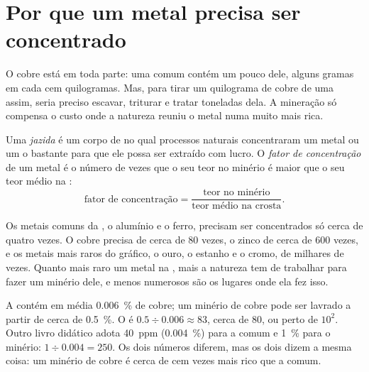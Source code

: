 \section{Por que um metal precisa ser concentrado}

O cobre está em toda parte: uma  comum contém um pouco dele, alguns
gramas em cada cem quilogramas. Mas, para tirar um quilograma de cobre de
uma  assim, seria preciso escavar, triturar e tratar toneladas dela.
A mineração só compensa o custo onde a natureza reuniu o metal numa 
muito mais rica.

\begin{definition}\label{def:g9:earth-resources:ore-deposit}
Uma \emph{jazida} é um corpo de  no qual processos
naturais concentraram um metal ou um  o bastante para que ele
possa ser extraído com lucro. O \emph{fator de
concentração} de um
metal é o número de vezes que o seu teor no minério é maior que o seu
teor médio na :
\[
\text{fator de concentração} = \frac{\text{teor no minério}}{\text{teor médio na crosta}} .
\]
\end{definition}

Os metais comuns da , o alumínio e o ferro, precisam ser
concentrados só cerca de quatro vezes. O cobre precisa de cerca de 80
vezes, o zinco de cerca de 600 vezes, e os metais mais raros do gráfico,
o ouro, o estanho e o cromo, de milhares de vezes. Quanto mais raro um
metal na , mais a natureza tem de trabalhar para fazer um minério
dele, e menos numerosos são os lugares onde ela fez isso.

\begin{example}[O cobre]
A  contém em média \qty{0.006}{\%} de cobre; um minério de cobre
pode ser lavrado a partir de cerca de \qty{0.5}{\%}. O  é $0.5 \div 0.006
\approx 83$, cerca de 80, ou perto de $10^2$. Outro livro didático adota
\qty{40}{ppm} (\qty{0.004}{\%}) para a  comum e \qty{1}{\%} para o
minério: $1 \div
0.004 = 250$. Os dois números diferem, mas os dois dizem a mesma coisa:
um minério de cobre é cerca de cem vezes mais rico que a  comum.
\end{example}

